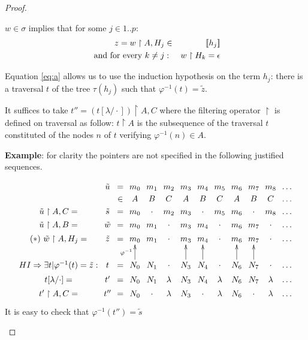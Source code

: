 \begin{proof}
\begin{itemize}
\begin{itemize}
        $w \in \sigma$ implies that for some $j \in 1..p$:
        \begin{eqnarray}
          z = w \upharpoonright A, H_j &\in& {[\![ h_j ]\!]}  \label{eq:a} \\
          \mbox{ and for every } k\neq j &:& w \upharpoonright H_k = \epsilon \label{eq:b}
        \end{eqnarray}

        Equation \ref{eq:a} allows us to use the induction hypothesis on the term $h_j$:
        there is a traversal $t$ of the tree $\tau(h_j)$ such that $\varphi^{-1}(t) = \tilde{z}$.



        It suffices to take $t'' = (t[\lambda / \cdot]) \upharpoonright A,C$ where
        the filtering operator $\upharpoonright$ is defined on traversal as follow:
        $t\upharpoonright A$ is the subsequence of the traversal $t$ constituted of the nodes $n$ of $t$ verifying
        $\varphi^{-1}(n) \in A$.

        \textbf{Example}: for clarity the pointers are not specified in the following justified sequences.

        $$
        \xymatrix @=1pt{
          & \tilde{u} &=& m_0 & m_1 & m_2 & m_3 & m_4 & m_5 & m_6 & m_7 & m_8 & \ldots \\
          & &\in& A & B & C & A & B & C & A & B & C & \ldots \\
          \tilde{u} \upharpoonright A, C =& \tilde{s} &=& m_0 & \cdot & m_2 & m_3 & \cdot & m_5 & m_6 & \cdot & m_8 & \ldots \\
          \tilde{u} \upharpoonright A, B =& \tilde{w} &=& m_0 & m_1 & \cdot & m_3 & m_4 & \cdot & m_6 & m_7 & \cdot & \ldots \\
          (\ast)\ \tilde{w} \upharpoonright A, H_j = & \tilde{z}  &=& m_0 & m_1 & \cdot & m_3 & m_4 & \cdot & m_6 & m_7 & \cdot & \ldots  \\ \\ \\
          HI \imp \exists t | \varphi^{-1}(t) = \tilde{z}: & t &=& N_0 \ar[uuu]^{\varphi^{-1}} & N_1 & \cdot & N_3 \ar[uuu] & N_4\ar[uuu] & \cdot & N_6\ar[uuu] & N_7\ar[uuu] & \cdot & \ldots \\
          t[\lambda/\cdot] =& t' &=& N_0 & N_1 & \lambda & N_3 & N_4 & \lambda & N_6 & N_7 & \lambda & \ldots \\
          t'\upharpoonright A,C =& t'' &=& N_0 & \cdot & \lambda & N_3 & \cdot & \lambda & N_6 & \cdot & \lambda & \ldots \\
          }
        $$
        It is easy to check that $\varphi^{-1}(t'') = \tilde{s}$




\end{itemize}
\end{itemize}
\end{proof}
